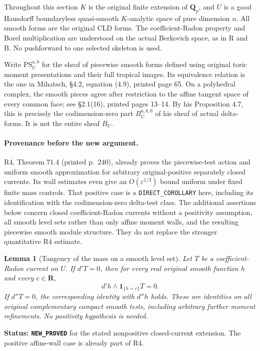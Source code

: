 \documentclass[11pt,a4paper]{article}
\numberwithin{equation}{section}
\newtheorem{lemma}[theorem]{Lemma}
\theoremstyle{definition}
\theoremstyle{remark}
\begin{document}
Throughout this section $K$ is the original finite extension of
$\mathbf Q_p$, and $U$ is a good Hausdorff boundaryless quasi-smooth
$K$-analytic space of pure dimension $n$. All smooth forms are the
original CLD forms. The coefficient-Radon property and Borel
multiplication are understood on the actual Berkovich space, as in
R and B. No pushforward to one selected skeleton is used.

Write $\mathrm{PS}^{a,b}_U$ for the sheaf of piecewise smooth forms
defined using original toric moment presentations and their full
tropical images. Its equivalence relation is the one in Mihatsch,
\S4.2, equation (4.9), printed page 65. On a polyhedral complex,
the smooth pieces agree after restriction to the affine tangent
space of every common face; see \S2.1(16), printed pages 13--14.
By his Proposition 4.7, this is precisely the codimension-zero
part $B^{a,b,0}_U$ of his sheaf of actual delta-forms. It is not
the entire sheaf $B_U$.

\paragraph{Provenance before the new argument.}
R4, Theorem 71.4 (printed p.~240), already proves the
piecewise-test action and uniform smooth approximation for
arbitrary original-positive separately closed currents.
Its wall estimates even give an $O(\varepsilon^{1/2})$ bound
uniform under fixed finite mass controls. That positive
case is a \texttt{DIRECT\_COROLLARY} here, including its
identification with the codimension-zero delta-test class.
The additional assertions below concern closed
coefficient-Radon currents without a positivity assumption,
all smooth level sets rather than only affine moment walls,
and the resulting piecewise smooth module structure. They
do not replace the stronger quantitative R4 estimate.

\begin{lemma}[Tangency of the mass on a smooth level set]
\label{lem:r6-level-tangency}
Let $T$ be a coefficient-Radon current on $U$. If $d'T=0$, then
for every real original smooth function $h$ and every $c\in\mathbf R$,
\[
       d'h\wedge\mathbf 1_{\{h=c\}}T=0.
\]
If $d''T=0$, the corresponding identity with $d''h$ holds.
These are identities on all original complementary compact
smooth tests, including arbitrary further moment refinements.
No positivity hypothesis is needed.
\end{lemma}

\noindent\textbf{Status: \texttt{NEW\_PROVED}} for the stated
nonpositive closed-current extension. The positive affine-wall
case is already part of R4.
\end{document}
